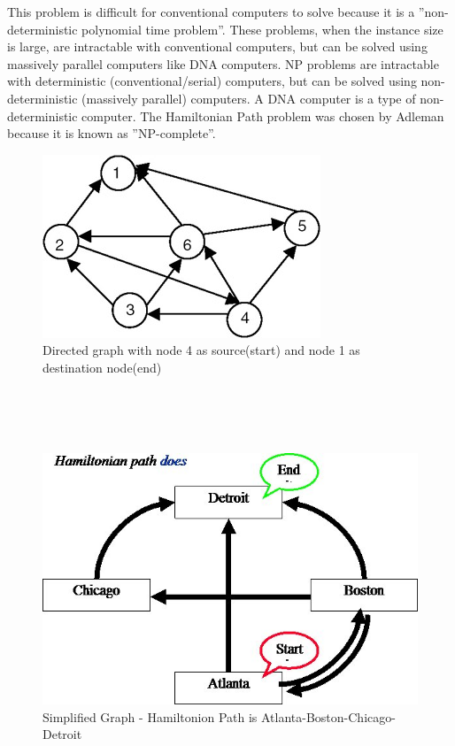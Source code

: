 \documentclass[a4paper]{article}
\begin{document}
This problem is difficult for conventional computers to solve because it is a  ”non-deterministic  polynomial  time  problem”.  These  problems,  when the  instance  size  is  large,  are  intractable  with  conventional  computers, but   can   be   solved   using   massively   parallel   computers   like   DNA computers.     NP     problems     are     intractable     with     deterministic (conventional/serial)   computers,   but   can   be   solved   using   non-deterministic (massively parallel) computers. A DNA computer is a type of non-deterministic  computer.  The  Hamiltonian  Path  problem  was  chosen by Adleman because it is known as ”NP-complete”.
  \begin{figure}[h!]
    \centering
      \includegraphics[width=\textwidth]{graphHPP}
      \caption{Directed graph with node 4 as source(start) and node 1 as destination node(end)}
  \end{figure}
    \\ \\ \\
  \begin{figure}
      \centering
      \includegraphics[width=\textwidth]{hpp_converted}
      \caption{Simplified Graph - Hamiltonion Path is Atlanta-Boston-Chicago-Detroit}
  \end{figure}
\end{document}
